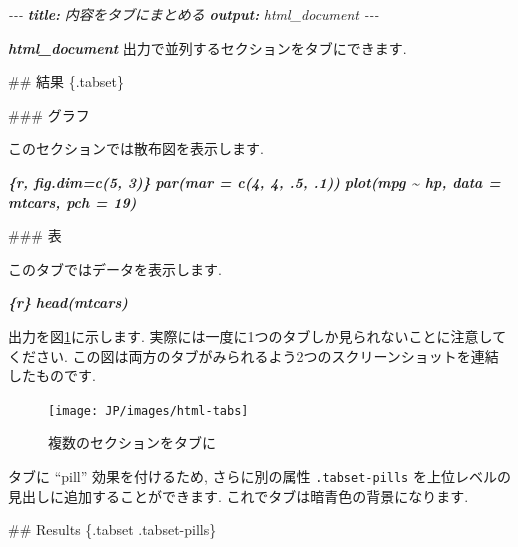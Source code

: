 \documentclass[
  11pt,
  lualatex,ja=standard,jafont=noto]{bxjsreport}
\newenvironment{Shaded}{\begin{snugshade}}{\end{snugshade}}
\newcommand{\AnnotationTok}[1]{\textcolor[rgb]{0.56,0.35,0.01}{\textbf{\textit{#1}}}}
\newcommand{\CommentTok}[1]{\textcolor[rgb]{0.56,0.35,0.01}{\textit{#1}}}
\newcommand{\FunctionTok}[1]{\textcolor[rgb]{0.00,0.00,0.00}{#1}}
\newcommand{\InformationTok}[1]{\textcolor[rgb]{0.56,0.35,0.01}{\textbf{\textit{#1}}}}
\newcommand{\NormalTok}[1]{#1}
\begin{document}
\begin{Shaded}
\begin{Highlighting}[]
\CommentTok{{-}{-}{-}}
\AnnotationTok{title:}\CommentTok{ 内容をタブにまとめる}
\AnnotationTok{output:}\CommentTok{ html\_document}
\CommentTok{{-}{-}{-}}

\InformationTok{\textasciigrave{}html\_document\textasciigrave{}}\NormalTok{ 出力で並列するセクションをタブにできます.}

\FunctionTok{\#\# 結果 \{.tabset\}}

\FunctionTok{\#\#\# グラフ}

\NormalTok{このセクションでは散布図を表示します.}

\InformationTok{\textasciigrave{}\textasciigrave{}\textasciigrave{}\{r, fig.dim=c(5, 3)\}}
\InformationTok{par(mar = c(4, 4, .5, .1))}
\InformationTok{plot(mpg \textasciitilde{} hp, data = mtcars, pch = 19)}
\InformationTok{\textasciigrave{}\textasciigrave{}\textasciigrave{}}

\FunctionTok{\#\#\# 表}

\NormalTok{このタブではデータを表示します.}

\InformationTok{\textasciigrave{}\textasciigrave{}\textasciigrave{}\{r\}}
\InformationTok{head(mtcars)}
\InformationTok{\textasciigrave{}\textasciigrave{}\textasciigrave{}}
\end{Highlighting}
\end{Shaded}

出力を図\ref{fig:html-tabs}に示します. 実際には一度に1つのタブしか見られないことに注意してください. この図は両方のタブがみられるよう2つのスクリーンショットを連結したものです.

\begin{figure}

{\centering \texttt{[image: JP/images/html-tabs]} 

}

\caption{複数のセクションをタブに}\label{fig:html-tabs}
\end{figure}

タブに ``pill'' 効果を付けるため, さらに別の属性 \texttt{.tabset-pills} を上位レベルの見出しに追加することができます. これでタブは暗青色の背景になります.

\begin{Shaded}
\begin{Highlighting}[]
\FunctionTok{\#\# Results \{.tabset .tabset{-}pills\}}
\end{Highlighting}
\end{Shaded}
\end{document}
